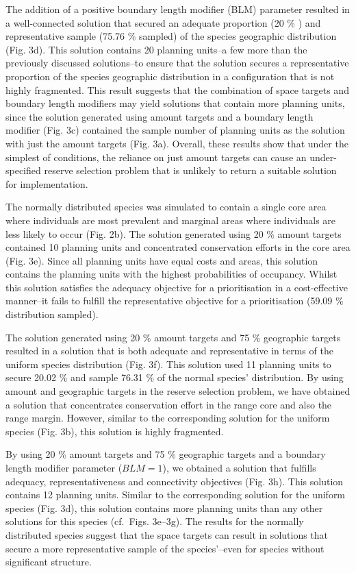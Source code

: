 \documentclass[11pt,]{article}
\begin{document}
The addition of a positive boundary length modifier (BLM) parameter
resulted in a well-connected solution that secured an adequate
proportion (20 \% ) and representative sample (75.76 \% sampled) of the
species geographic distribution (Fig. 3d). This solution contains 20
planning units--a few more than the previously discussed solutions--to
ensure that the solution secures a representative proportion of the
species geographic distribution in a configuration that is not highly
fragmented. This result suggests that the combination of space targets
and boundary length modifiers may yield solutions that contain more
planning units, since the solution generated using amount targets and a
boundary length modifier (Fig. 3c) contained the sample number of
planning units as the solution with just the amount targets (Fig. 3a).
Overall, these results show that under the simplest of conditions, the
reliance on just amount targets can cause an under-specified reserve
selection problem that is unlikely to return a suitable solution for
implementation.

The normally distributed species was simulated to contain a single core
area where individuals are most prevalent and marginal areas where
individuals are less likely to occur (Fig. 2b). The solution generated
using 20 \% amount targets contained 10 planning units and concentrated
conservation efforts in the core area (Fig. 3e). Since all planning
units have equal costs and areas, this solution contains the planning
units with the highest probabilities of occupancy. Whilst this solution
satisfies the adequacy objective for a prioritisation in a
cost-effective manner--it fails to fulfill the representative objective
for a prioritisation (59.09 \% distribution sampled).

The solution generated using 20 \% amount targets and 75 \% geographic
targets resulted in a solution that is both adequate and representative
in terms of the uniform species distribution (Fig. 3f). This solution
used 11 planning units to secure 20.02 \% and sample 76.31 \% of the
normal species' distribution. By using amount and geographic targets in
the reserve selection problem, we have obtained a solution that
concentrates conservation effort in the range core and also the range
margin. However, similar to the corresponding solution for the uniform
species (Fig. 3b), this solution is highly fragmented.

By using 20 \% amount targets and 75 \% geographic targets and a
boundary length modifier parameter ($BLM = 1$), we obtained a solution
that fulfills adequacy, representativeness and connectivity objectives
(Fig. 3h). This solution contains 12 planning units. Similar to the
corresponding solution for the uniform species (Fig. 3d), this solution
contains more planning units than any other solutions for this species
(cf.~Figs. 3e--3g). The results for the normally distributed species
suggest that the space targets can result in solutions that secure a
more representative sample of the species'--even for species without
significant structure.
\end{document}
